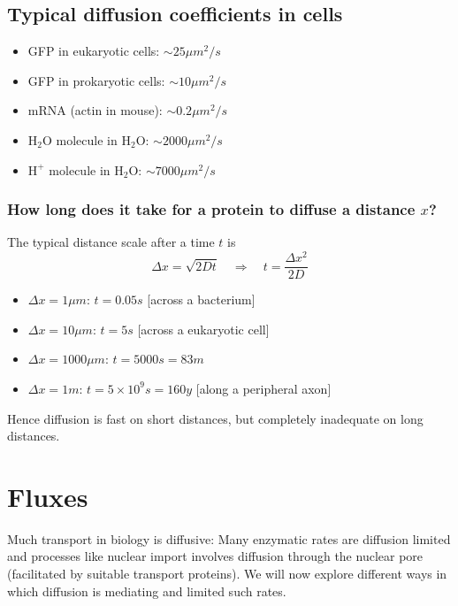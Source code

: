 \subsection{Typical diffusion coefficients in cells}

\begin{itemize}
  \item GFP in eukaryotic cells: $\sim 25 \mu m^2/s$
  \item GFP in prokaryotic cells: $\sim 10 \mu m^2/s$
  \item mRNA (actin in mouse): $\sim 0.2 \mu m^2/s$
  \item $\mathrm{H_2O}$ molecule in $\mathrm{H_2O}$: $\sim 2000 \mu m^2/s$
  \item $\mathrm{H^+}$ molecule in $\mathrm{H_2O}$: $\sim 7000 \mu m^2/s$
\end{itemize}


\subsubsection{How long does it take for a protein to diffuse a distance $x$?}
The typical distance scale after a time $t$ is
\begin{equation}
	\Delta x = \sqrt{2Dt} \quad \Rightarrow \quad t = \frac{\Delta x^2}{2D}
\end{equation}

\begin{itemize}
  \item $\Delta x = 1\mu m$: $t = 0.05s$ [across a bacterium]
  \item $\Delta x = 10\mu m$: $t = 5s$   [across a eukaryotic cell]
  \item $\Delta x = 1000\mu m$: $t = 5000s=83m$
  \item $\Delta x = 1m$: $t = 5\times 10^9s=160y$   [along a peripheral axon]
\end{itemize}
Hence diffusion is fast on short distances, but completely inadequate on long distances.


\section{Fluxes}
Much transport in biology is diffusive: Many enzymatic rates are diffusion limited and processes like nuclear import involves diffusion through the nuclear pore (facilitated by suitable transport proteins).
We will now explore different ways in which diffusion is mediating and limited such rates.

